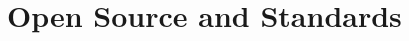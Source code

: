 \documentclass[10pt,a4paper,sans]{moderncv}   %
\begin{document}


%


\section{Open Source and Standards}
\end{document}
